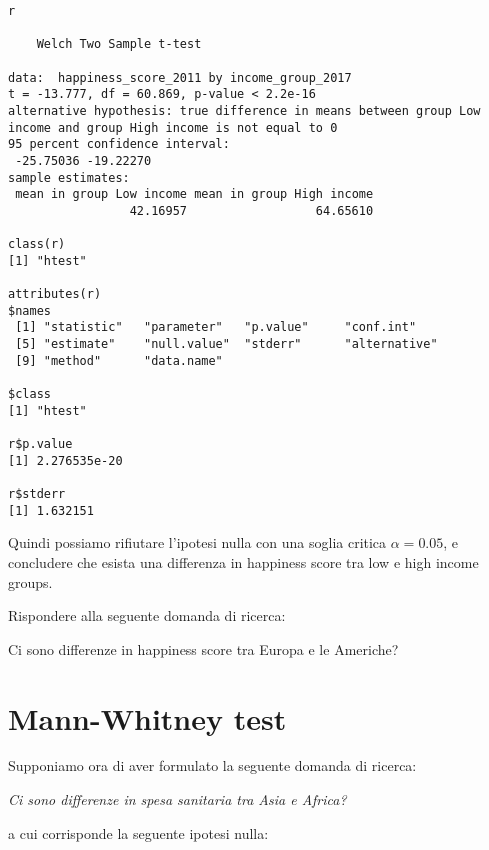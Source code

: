 \begin{lstlisting}[style=Rstyle]
r 

	Welch Two Sample t-test

data:  happiness_score_2011 by income_group_2017
t = -13.777, df = 60.869, p-value < 2.2e-16
alternative hypothesis: true difference in means between group Low income and group High income is not equal to 0
95 percent confidence interval:
 -25.75036 -19.22270
sample estimates:
 mean in group Low income mean in group High income 
                 42.16957                  64.65610 
				 
class(r)	
[1] "htest"

attributes(r)
$names
 [1] "statistic"   "parameter"   "p.value"     "conf.int"   
 [5] "estimate"    "null.value"  "stderr"      "alternative"
 [9] "method"      "data.name"  

$class
[1] "htest"

r$p.value
[1] 2.276535e-20

r$stderr
[1] 1.632151		 
\end{lstlisting}
%
Quindi possiamo rifiutare l'ipotesi nulla con una soglia critica $\alpha = 0.05$, e concludere che esista una differenza in happiness score tra low e high income groups.


\vspace{0.5cm} 

\begin{exercise}\label{ex5.4}

\noindent Rispondere alla seguente domanda di ricerca: 

\centerline{Ci sono differenze in happiness score tra Europa e le Americhe?}

\end{exercise}

\section{Mann-Whitney test}

\noindent Supponiamo ora di aver formulato la seguente domanda di ricerca: 

\vspace{0.2cm}

\centerline{\emph{Ci sono differenze in spesa sanitaria tra Asia e Africa?}}

\vspace{0.2cm}

\noindent a cui corrisponde la seguente ipotesi nulla:

\vspace{0.2cm}

